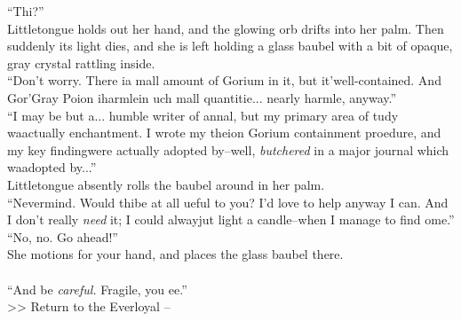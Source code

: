 “Thi\lisp ?” \\

Littletongue holds out her hand, and the glowing orb drifts into her palm. Then suddenly its light dies, and she is left holding a glass baubel with a bit of opaque, gray crystal rattling inside.\\

“Don’t worry. There i\lispx a \lisp mall amount of Gorium in it, but it’\lispx well-contained. And Gor’\lispx Gray Poi\lisp on i\lispx harmle\lispx in \lisp uch \lisp mall quantitie\lisp ... nearly harmle\lisp , anyway.”\\

“I may be but a... humble writer of annal\lisp , but my primary area of \lisp tudy wa\lispx actually enchantment. I wrote my the\lisp i\lispx on Gorium containment pro\lisp edure\lisp , and my key finding\lispx were actually adopted by--well, \emph{butchered} in a major journal which wa\lispx adopted by...”\\

Littletongue absently rolls the baubel around in her palm.\\
“Nevermind. Would thi\lispx be at all u\lisp eful to you? I’d love to help anyway I can. And I don’t really \emph{need} it; I could alway\lispx ju\lisp t light a candle--when I manage to find \lisp ome.”\\

“No, no. Go ahead!”\\

She motions for your hand, and places the glass baubel there.\\
\\

“And be \emph{careful.} Fragile, you \lisp ee.”\\

>>  Return to the Everloyal -- 
